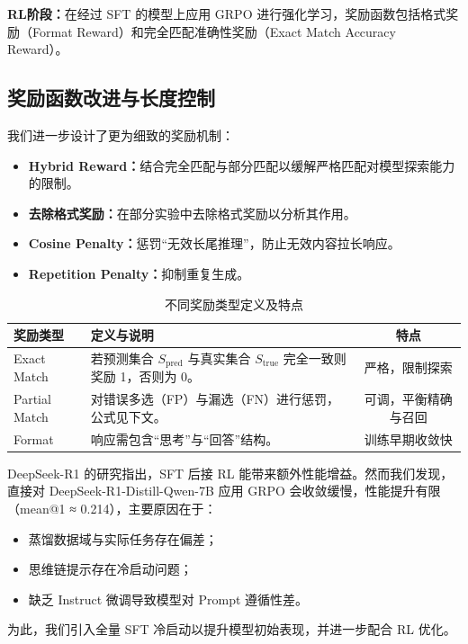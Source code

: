 \documentclass{pkuthesis}
\begin{document}
\textbf{RL阶段：}在经过 SFT 的模型上应用 GRPO 进行强化学习，奖励函数包括格式奖励（Format Reward）和完全匹配准确性奖励（Exact Match Accuracy Reward）。

\subsection{奖励函数改进与长度控制}

我们进一步设计了更为细致的奖励机制：

\begin{itemize}
  \item \textbf{Hybrid Reward：}结合完全匹配与部分匹配以缓解严格匹配对模型探索能力的限制。
  \item \textbf{去除格式奖励：}在部分实验中去除格式奖励以分析其作用。
  \item \textbf{Cosine Penalty：}惩罚“无效长尾推理”，防止无效内容拉长响应。
  \item \textbf{Repetition Penalty：}抑制重复生成。
\end{itemize}

\begin{table}[h]
  \centering
  \caption{不同奖励类型定义及特点}
  \begin{tabular}{l|p{8cm}|c}
    \hline
    奖励类型 & 定义与说明 & 特点 \\
    \hline
    Exact Match & 若预测集合 $S_{\text{pred}}$ 与真实集合 $S_{\text{true}}$ 完全一致则奖励 1，否则为 0。 & 严格，限制探索 \\
    Partial Match & 对错误多选（FP）与漏选（FN）进行惩罚，公式见下文。 & 可调，平衡精确与召回 \\
    Format & 响应需包含“思考”与“回答”结构。 & 训练早期收敛快 \\
    \hline
  \end{tabular}
\end{table}

DeepSeek-R1 的研究指出，SFT 后接 RL 能带来额外性能增益。然而我们发现，直接对 DeepSeek-R1-Distill-Qwen-7B 应用 GRPO 会收敛缓慢，性能提升有限（mean@1 ≈ 0.214），主要原因在于：

\begin{itemize}
  \item 蒸馏数据域与实际任务存在偏差；
  \item 思维链提示存在冷启动问题；
  \item 缺乏 Instruct 微调导致模型对 Prompt 遵循性差。
\end{itemize}

为此，我们引入全量 SFT 冷启动以提升模型初始表现，并进一步配合 RL 优化。
\end{document}
